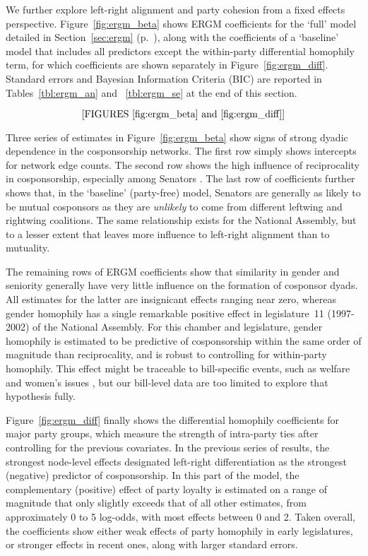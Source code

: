 We further explore left-right alignment and party cohesion from a fixed effects perspective. Figure~\ref{fig:ergm_beta} shows ERGM coefficients for the `full' model detailed in Section~\ref{sec:ergm} (p.~\pageref{sec:ergm}), along with the coefficients of a `baseline' model that includes all predictors except the within-party differential homophily term, for which coefficients are shown separately in Figure~\ref{fig:ergm_diff}. Standard errors and Bayesian Information Criteria (BIC) are reported in Tables~\ref{tbl:ergm_an} and ~\ref{tbl:ergm_se} at the end of this section.%

$$\textrm{[FIGURES~\ref{fig:ergm_beta} and~\ref{fig:ergm_diff}]}$$

Three series of estimates in Figure~\ref{fig:ergm_beta} show signs of strong dyadic dependence in the cosponsorship networks. The first row simply shows intercepts for network edge counts. The second row shows the high influence of reciprocality in cosponsorship, especially among Senators \citep[see also][p.~78]{CranmerDesmarais2011-PA}. The last row of coefficients further shows that, in the `baseline' (party-free) model, Senators are generally as likely to be mutual cosponsors as they are \emph{unlikely} to come from different leftwing and rightwing coalitions. The same relationship exists for the National Assembly, but to a lesser extent that leaves more influence to left-right alignment than to mutuality.%

The remaining rows of ERGM coefficients show that similarity in gender and seniority generally have very little influence on the formation of cosponsor dyads. All estimates for the latter are insignicant effects ranging near zero, whereas gender homophily has a single remarkable positive effect in legislature~11 (1997-2002) of the National Assembly. For this chamber and legislature, gender homophily is estimated to be predictive of cosponsorship within the same order of magnitude than reciprocality, and is robust to controlling for within-party homophily. This effect might be traceable to bill-specific events, such as welfare and women's issues \citep{ClarkCaro2013-PG}, but our bill-level data are too limited to explore that hypothesis fully.%

Figure~\ref{fig:ergm_diff} finally shows the differential homophily coefficients for major party groups, which measure the strength of intra-party ties after controlling for the previous covariates. In the previous series of results, the strongest node-level effects designated left-right differentiation as the strongest (negative) predictor of cosponsorship. In this part of the model, the complementary (positive) effect of party loyalty is estimated on a range of magnitude that only slightly exceeds that of all other estimates, from approximately 0 to 5 log-odds, with most effects between 0 and 2. Taken overall, the coefficients show either weak effects of party homophily in early legislatures, or stronger effects in recent ones, along with larger standard errors.

